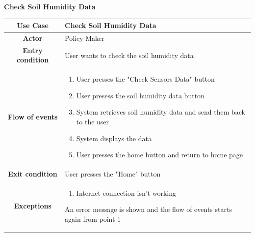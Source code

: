 \documentclass[table, 12pt]{article}
\begin{document}
\begin{itemize}
            \begin{table}[H]
                \item[] \textbf{Check Soil Humidity Data}
                \item[] 
                \centering
                \begin{tabular}{|c| m{}|}
                    \hline
                    \textbf{Use Case} & Check Soil Humidity Data\\ \hline
                    \textbf{Actor} & Policy Maker \\ \hline
                    \textbf{Entry condition} & User wants to check the soil humidity data\\  \hline
                    \textbf{Flow of events} & \begin{enumerate}
                                                \item User presses the "Check Sensors Data" button
                                                \item User presess the soil humidity data button
                                                \item System retrieves soil humidity data and send them back to the user
                                                \item System displays the data
                                                \item User presses the home button and return to home page
                                            \end{enumerate}\\ \hline
                    \textbf{Exit condition} & User presses the "Home" button\\ \hline
                    \textbf{Exceptions} &  \begin{enumerate}
                        \item Internet connection isn't working
                    \end{enumerate}
                    An error message is shown and the flow of events starts again from point 1\\ \hline                   
                \end{tabular}
            \end{table}


\end{itemize}
\end{document}
